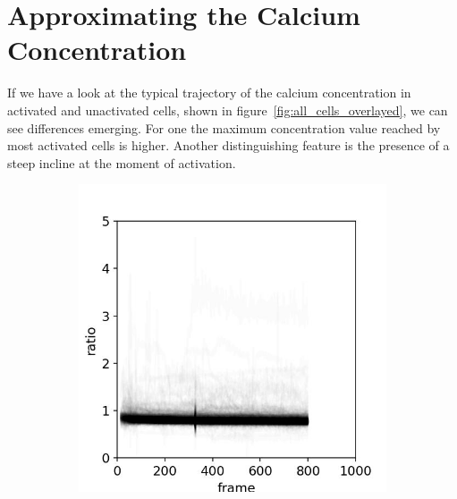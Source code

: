 \chapter{Approximating the Calcium Concentration}
\label{chapter:approximating}

If we have a look at the typical trajectory of the calcium concentration in activated and unactivated cells, shown in figure~\ref{fig:all_cells_overlayed}, we can see differences emerging. For one the maximum concentration value reached by most activated cells is higher. Another distinguishing feature is the presence of a steep incline at the moment of activation.

\begin{figure}[h]
	\centering
	\begin{subfigure}{0.45\linewidth}
		\includegraphics[width=\textwidth]{fig/all_cells_overlayed_mouse_neg}
	\end{subfigure}
	\hfill
	\begin{subfigure}{0.45\linewidth}

\end{subfigure}
\end{figure}
